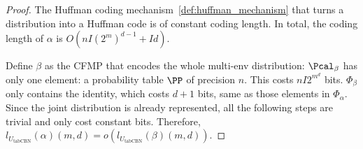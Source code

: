 \begin{proof}
    The Huffman coding mechanism~\cref{def:huffman_mechanism} that turns a distribution into a Huffman code is of constant coding length. In total, the coding length of $\alpha$ is $O(nI (2^m)^{d-1} + Id)$.

    Define $\beta$ as the CFMP that encodes the whole multi-env distribution: $\Pcal_\beta$ has only one element: a probability table $\PP$ of precision $n$. This costs $nI2^{m^d}$ bits. $\Phi_\beta$ only contains the identity, which costs $d+1$ bits, same as those elements in $\Phi_\alpha$. Since the joint distribution is already represented, all the following steps are trivial and only cost constant bits. Therefore, $l_{U_{\text{tabCBN}}} (\alpha)(m,d) = o(l_{U_{\text{tabCBN}}} (\beta)(m,d))$.




\end{proof}

